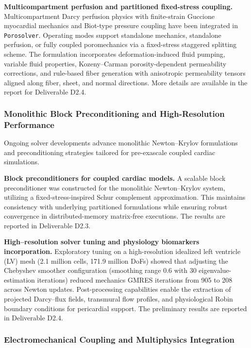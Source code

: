 \documentclass[a4paper,12pt, numbers]{article}
\begin{document}
\noindent\textbf{Multicompartment perfusion and partitioned fixed-stress coupling.}
Multicompartment Darcy perfusion physics with finite-strain Guccione myocardial mechanics and Biot-type pressure coupling have been integrated in \texttt{Porosolver}. Operating modes support standalone mechanics, standalone perfusion, or fully coupled poromechanics via a fixed-stress staggered splitting scheme. The formulation incorporates deformation-induced fluid pumping, variable fluid properties, Kozeny--Carman porosity-dependent permeability corrections, and rule-based fiber generation with anisotropic permeability tensors aligned along fiber, sheet, and normal directions. More details are available in the report for Deliverable D2.4.

\subsubsection*{Monolithic Block Preconditioning and High-Resolution Performance}

\noindent Ongoing solver developments advance monolithic Newton--Krylov formulations and preconditioning strategies tailored for pre-exascale coupled cardiac simulations.

\noindent\textbf{Block preconditioners for coupled cardiac models.}
A scalable block preconditioner was constructed for the monolithic Newton--Krylov system, utilizing a fixed-stress-inspired Schur complement approximation. This maintains consistency with underlying partitioned formulations while ensuring robust convergence in distributed-memory matrix-free executions. The results are reported in Deliverable D2.3.

\noindent\textbf{High--resolution solver tuning and physiology biomarkers incorporation.}
Exploratory tuning on a high-resolution idealized left ventricle (LV) mesh (2.1 million cells, 171.9 million DoFs) showed that adjusting the Chebyshev smoother configuration (smoothing range 0.6 with 30 eigenvalue-estimation iterations) reduced mechanics GMRES iterations from 905 to 208 across Newton updates. Post-processing capabilities enable the extraction of projected Darcy--flux fields, transmural flow profiles, and physiological Robin boundary conditions for pericardial support. The preliminary results are reported in Deliverable D2.4.

\subsubsection*{Electromechanical Coupling and Multiphysics Integration}
\end{document}
